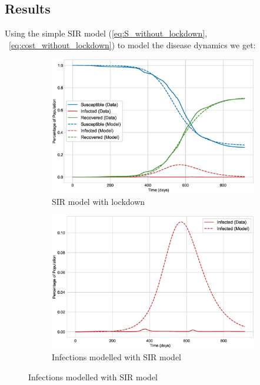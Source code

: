 \documentclass[tikz,fleqn,12pt]{wlscirep}
\begin{document}
\subsection*{Results}
Using the simple SIR model (\ref{eq:S_without_lockdown}, ~\ref{eq:cost_without_lockdown}) to model the disease dynamics we get:
\begin{figure}[H]
  \centering
  \caption{SIR Model with lockdown for India}
  \begin{subfigure}[t]{\textwidth}
    \centering
    \includegraphics[scale=0.5]{images/SIR_model_IND.eps}
    \caption{SIR model with lockdown}
    \label{fig:SIR_model_IND}
  \end{subfigure}
  \begin{subfigure}[t]{\textwidth}
    \centering
    \includegraphics[scale=0.50]{images/SIR_model_infections_IND.eps}
    \caption{Infections modelled with SIR model}
    \label{fig:SIR_model_infections_IND}
  \end{subfigure}
\end{figure}
\end{document}
